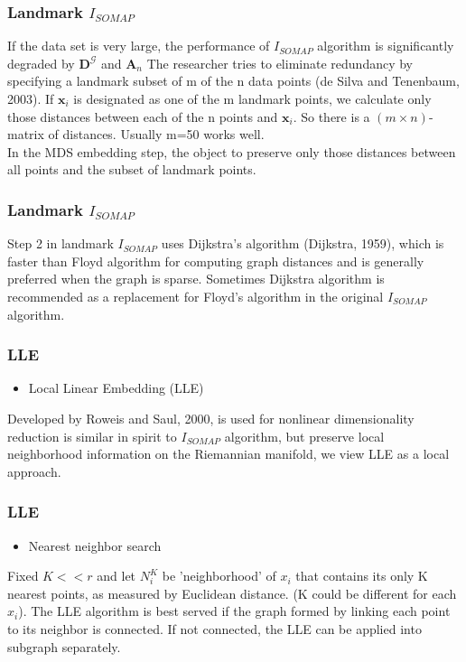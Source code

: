 \documentclass{beamer}
\begin{document}
\begin{frame}
\frametitle{Landmark $I_{SOMAP}$}
If the data set is very large, the performance of $I_{SOMAP}$ algorithm is significantly degraded by $\textbf{D}^{\mathcal{G}}$ and $\textbf{A}_n$\newline
The researcher tries to eliminate redundancy by specifying a landmark subset of m of the n data points (de Silva and Tenenbaum, 2003).  If $\textbf{x}_i$ is designated as one of the m landmark points, we calculate only those distances between each of the n points and $\textbf{x}_i$. So there is a $(m \times n)$-matrix of distances. Usually m=50 works well.\\
In the MDS embedding step, the object to preserve only those distances between all points and the subset of landmark points. 
\end{frame}

\begin{frame}
\frametitle{Landmark $I_{SOMAP}$}
Step 2 in landmark $I_{SOMAP}$ uses Dijkstra's algorithm (Dijkstra, 1959), which is faster than Floyd algorithm for computing graph distances and is generally preferred when the graph is sparse.\newline \newline
Sometimes Dijkstra algorithm is recommended as a replacement for Floyd's algorithm in the original $I_{SOMAP}$ algorithm.
\end{frame}

\begin{frame}
\frametitle{LLE}
\begin{itemize}
\item{Local Linear Embedding (LLE)}
\end{itemize}
Developed by Roweis and Saul, 2000, is used for nonlinear dimensionality reduction is similar in spirit to $I_{SOMAP}$ algorithm, but preserve local neighborhood information on the Riemannian manifold, we view LLE as a local approach.
\end{frame}

\begin{frame}
\frametitle{LLE}
\begin{itemize}
  \item Nearest neighbor search
\end{itemize}
Fixed $K<<r$ and let $N_i^K$ be 'neighborhood' of $x_i$ that contains its only K nearest points, as measured by Euclidean distance. (K could be different for each $x_i$). \newline \newline
The LLE algorithm is best served if the graph formed by linking each point to its neighbor is connected. If not connected, the LLE can be applied into subgraph separately.
\end{frame}
\end{document}
